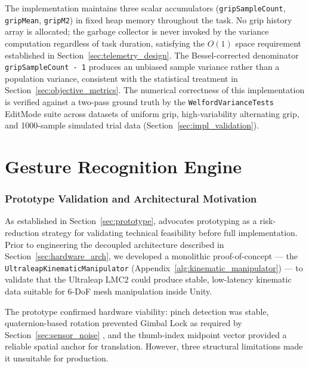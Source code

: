 The implementation maintains three scalar accumulators (\texttt{gripSampleCount}, \texttt{gripMean}, \texttt{gripM2}) in fixed heap memory throughout the task. No grip history array is allocated; the garbage collector is never invoked by the variance computation regardless of task duration, satisfying the $O(1)$ space requirement established in Section~\ref{sec:telemetry_design}. The Bessel-corrected denominator \texttt{gripSampleCount - 1} produces an unbiased sample variance rather than a population variance, consistent with the statistical treatment in Section~\ref{sec:objective_metrics}. The numerical correctness of this implementation is verified against a two-pass ground truth by the \texttt{WelfordVarianceTests} EditMode suite across datasets of uniform grip, high-variability alternating grip, and 1000-sample simulated trial data (Section~\ref{sec:impl_validation}).


\section{Gesture Recognition Engine}
\label{sec:gesture_engine}

\subsubsection{Prototype Validation and Architectural Motivation}
\label{sec:prototype_motivation}
As established in Section~\ref{sec:prototype}, \citet{Sommerville2016GlobAlEdiTioN} advocates prototyping as a risk-reduction strategy for validating technical feasibility before full implementation. Prior to engineering the decoupled architecture described in Section~\ref{sec:hardware_arch}, we developed a monolithic proof-of-concept --- the \texttt{UltraleapKinematicManipulator} (Appendix~\ref{alg:kinematic_manipulator}) --- to validate that the Ultraleap LMC2 could produce stable, low-latency kinematic data suitable for 6-DoF mesh manipulation inside Unity.

The prototype confirmed hardware viability: pinch detection was stable, quaternion-based rotation prevented Gimbal Lock as required by Section~\ref{sec:sensor_noise} \citep{Fang1998RealQuaternions}, and the thumb-index midpoint vector provided a reliable spatial anchor for translation. However, three structural limitations made it unsuitable for production.

